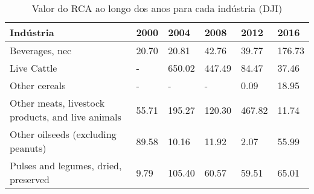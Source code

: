 \begin{table}
\centering
\caption{Valor do RCA ao longo dos anos para cada indústria (DJI)}
\begin{tabular}{p{6cm}p{1.5cm}p{1.5cm}p{1.5cm}p{1.5cm}p{1.5cm}}
\toprule
                                        Indústria &  2000 &   2004 &   2008 &   2012 &   2016 \\
\midrule
                                   Beverages, nec & 20.70 &  20.81 &  42.76 &  39.77 & 176.73 \\
                                      Live Cattle &     - & 650.02 & 447.49 &  84.47 &  37.46 \\
                                    Other cereals &     - &      - &      - &   0.09 &  18.95 \\
Other meats, livestock products, and live animals & 55.71 & 195.27 & 120.30 & 467.82 &  11.74 \\
               Other oilseeds (excluding peanuts) & 89.58 &  10.16 &  11.92 &   2.07 &  55.99 \\
             Pulses and legumes, dried, preserved &  9.79 & 105.40 &  60.57 &  59.51 &  65.01 \\
\bottomrule
\end{tabular}
\end{table}
